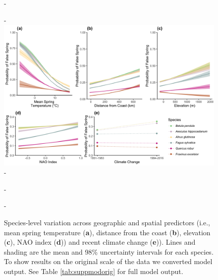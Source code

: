 \documentclass{article}\usepackage[]{graphicx}\usepackage[]{color}
\begin{document}
  
{\begin{figure} [H]
  -\begin{center}
  -\includegraphics[width=16cm]{..//analyses/figures/InteractionPlots/Species_orig.png}
  -\caption{Species-level variation across geographic and spatial predictors (i.e., mean spring temperature (\textbf{a}), distance from the coast (\textbf{b}), elevation (\textbf{c}), NAO index (\textbf{d})) and recent climate change (\textbf{e})). Lines and shading are the mean and 98\% uncertainty intervals for each species. To show results on the original scale of the data we converted model output. See Table \ref{tab:suppmodorig} for full model output. }\label{fig:spp}
  -\end{center}
  -\end{figure}}


  
\end{document}
